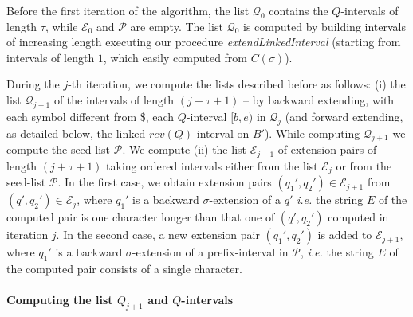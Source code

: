 \documentclass[runningheads,envcountsame,a4paper]{llncs}
\newcommand{\notaestesa}[2]{%
 \marginpar{\color{red!75!black}\textbf{\texttimes}}%
 {\color{red!75!black}%
 [\,\textbullet\,\textsf{\textbf{#1:}} %
 \textsf{\footnotesize#2}\,\textbullet\,]}%
}
\newcommand{\ie}{\textit{i.e.}\xspace}
\begin{document}





Before the first iteration of the algorithm, the list $\mathcal{Q}_0$ contains the
$Q$-intervals of length $\tau$, while  $\mathcal{E}_0$ and $\mathcal{P}$ are empty.
The list $\mathcal{Q}_0$ is computed  by building intervals of increasing length
executing our procedure \emph{extendLinkedInterval} (starting from intervals of
length $1$, which easily computed from $C(\sigma)$).



During the $j$-th iteration, we compute the lists described before as follows:
(i) the list $\mathcal{Q}_{j+1}$ of the
intervals of length $(j+\tau+1)$  -- by backward extending, with each symbol different from \$, each $Q$-interval $[b, e)$ in $\mathcal{Q}_{j}$ (and forward extending, as detailed  below, the
linked $rev(Q)$-interval on $B'$). While computing $\mathcal{Q}_{j+1}$ we compute the seed-list $\mathcal{P}$.
We compute
(ii) the list $\mathcal{E}_{j+1}$ of
extension pairs of length $(j+\tau+1)$  taking ordered intervals   either from
the  list   $\mathcal{E}_{j}$ or from the seed-list $\mathcal{P}$.
In the first case,
we obtain  extension pairs $(q_{1}',q_{2}') \in \mathcal{E}_{j+1}$  from $(q',q_{2}')\in \mathcal{E}_{j}$, where
$q_{1}'$ is a backward $\sigma$-extension
of a $q'$   \ie the string $E$ of the computed pair is one
character longer than that one of $(q', q_{2}')$ computed in iteration $j$.
In the second case,
a new  extension pair
$(q_{1}',q_{2}')$ is added to $\mathcal{E}_{j+1}$, where   $q_{1}'$ is a backward $\sigma$-extension
of a prefix-interval in $\mathcal{P}$,  \ie the string $E$ of the computed pair
consists of a single character.



\paragraph{Computing  the list $Q_{j+1} $ and $Q$-intervals}
\end{document}
